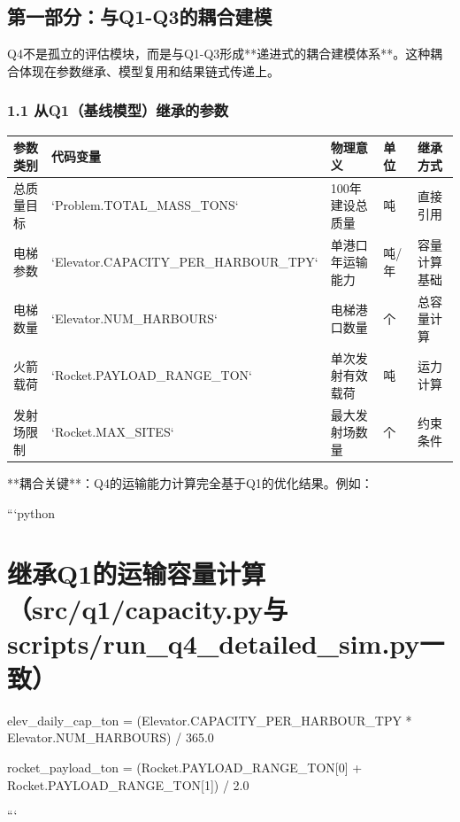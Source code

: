 \documentclass[a4paper,12pt]{article}
\begin{document}
\par
\subsection{第一部分：与Q1-Q3的耦合建模}
Q4不是孤立的评估模块，而是与Q1-Q3形成**递进式的耦合建模体系**。这种耦合体现在参数继承、模型复用和结果链式传递上。

\par
\subsubsection{1.1 从Q1（基线模型）继承的参数}
\begin{center}
\begin{longtable}{|l|l|l|l|l|}
\hline
参数类别 & 代码变量 & 物理意义 & 单位 & 继承方式 \\ \hline
总质量目标 & `Problem.TOTAL_MASS_TONS` & 100年建设总质量 & 吨 & 直接引用 \\ \hline
电梯参数 & `Elevator.CAPACITY_PER_HARBOUR_TPY` & 单港口年运输能力 & 吨/年 & 容量计算基础 \\ \hline
电梯数量 & `Elevator.NUM_HARBOURS` & 电梯港口数量 & 个 & 总容量计算 \\ \hline
火箭载荷 & `Rocket.PAYLOAD_RANGE_TON` & 单次发射有效载荷 & 吨 & 运力计算 \\ \hline
发射场限制 & `Rocket.MAX_SITES` & 最大发射场数量 & 个 & 约束条件 \\ \hline
\end{longtable}
\end{center}
**耦合关键**：Q4的运输能力计算完全基于Q1的优化结果。例如：

\par
```python

\par
\section{继承Q1的运输容量计算（src/q1/capacity.py与scripts/run_q4_detailed_sim.py一致）}
elev\_daily\_cap\_ton = (Elevator.CAPACITY\_PER\_HARBOUR\_TPY * Elevator.NUM\_HARBOURS) / 365.0

\par
rocket\_payload\_ton = (Rocket.PAYLOAD\_RANGE\_TON[0] + Rocket.PAYLOAD\_RANGE\_TON[1]) / 2.0

\par
```

\par
\end{document}
